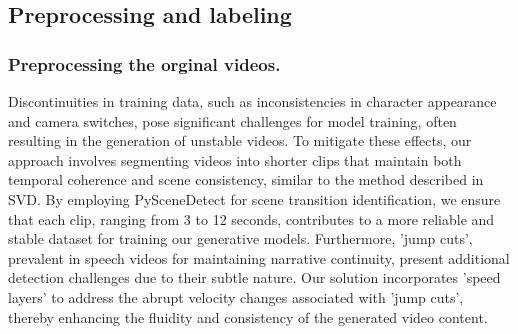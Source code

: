 \documentclass[runningheads]{llncs}
\begin{document}

\subsection{Preprocessing and labeling}

\subsubsection{Preprocessing the orginal videos.}
\label{sec::data}
Discontinuities in training data, such as inconsistencies in character appearance and camera switches, pose significant challenges for model training, often resulting in the generation of unstable videos. To mitigate these effects, our approach involves segmenting videos into shorter clips that maintain both temporal coherence and scene consistency, similar to the method described in SVD\cite{svd}. By employing PySceneDetect for scene transition identification, we ensure that each clip, ranging from 3 to 12 seconds, contributes to a more reliable and stable dataset for training our generative models. Furthermore, 'jump cuts', prevalent in speech videos for maintaining narrative continuity, present additional detection challenges due to their subtle nature. Our solution incorporates 'speed layers' to address the abrupt velocity changes associated with 'jump cuts', thereby enhancing the fluidity and consistency of the generated video content.
\end{document}
